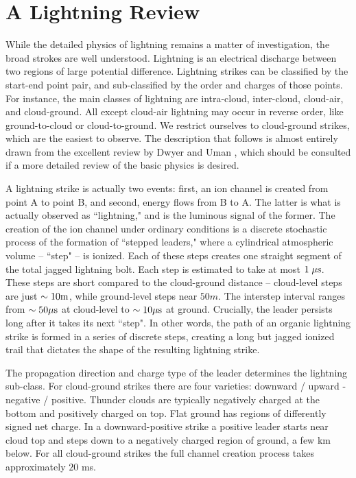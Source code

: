 \documentclass[%
 reprint,
 amsmath,amssymb,
 aps,
]{revtex4-2}
\newcommand{\vtwo}[1]{{\color{black} #1}}
\newcommand{\vfour}[1]{{\color{red} #1}}
\begin{document}


\section{A Lightning Review} %
\label{sec:a_lightning_review}

    While the detailed physics of lightning remains a matter of investigation, the broad strokes are well understood. Lightning is an electrical discharge between two regions of large potential difference. Lightning \vfour{strikes can be} classified by the start-end point pair, and sub-classified by the order and charges of those points. For instance, the main classes of lightning are intra-cloud, inter-cloud, cloud-air, and cloud-ground. All except cloud-air lightning may occur in reverse order, like ground-to-cloud or cloud-to-ground. We restrict ourselves to cloud-ground strikes, which are the easiest to observe. The description that follows is almost entirely drawn from the excellent review by Dwyer and Uman \vtwo{\citep{DwyerUman2014}}, \vfour{which should be consulted if a more detailed review of the basic physics is desired}.

    A lightning strike is actually two events: first, an ion channel is created from point A to point B, and second, energy flows from B to A. The latter is \vfour{what is actually observed as ``lightning," and} is the luminous signal of the former. The creation of the ion channel under ordinary conditions is a discrete stochastic process of the formation of ``stepped leaders," where a cylindrical atmospheric volume -- ``step" -- is ionized. \vfour{Each of these steps creates one straight segment of the total jagged lightning bolt. Each step is estimated} to take at most $1 \; \mu\rm{s}$. These steps are short compared to the cloud-ground distance -- cloud-level steps are just $\sim10 \rm{m}$, while ground-level steps near $50 m$. The \vtwo{interstep} interval ranges from $\sim50 \mu\rm{s}$ at cloud-level to $\sim10 \mu\rm{s}$ at ground. \vfour{Crucially, the leader} persists long after \vfour{it} takes its next ``step". \vfour{In other words, the path of an organic lightning strike is formed in a series of discrete steps, creating a long but jagged ionized trail that dictates the shape of the resulting lightning strike.}

    The propagation direction and charge type of the leader determines the lightning sub-class. For cloud-ground strikes there are four varieties: downward / upward - negative / positive. Thunder clouds are \vfour{typically} negatively charged at the bottom and positively charged on top. Flat ground has regions of differently signed net charge. \vtwo{In a downward-positive strike a positive leader starts near cloud top and steps down to a negatively charged region of ground, a few km below.} For all cloud-ground strikes the full channel creation process takes approximately $20$ ms.
\end{document}
